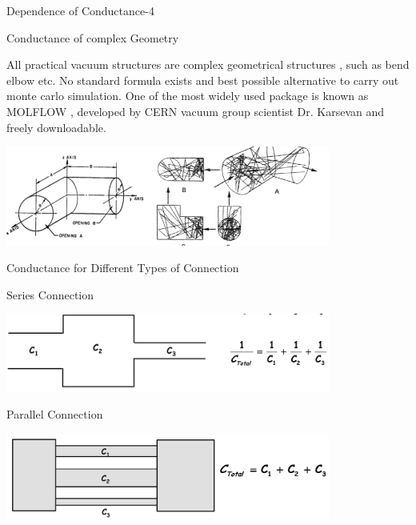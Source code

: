 \documentclass[11]{beamer}
\begin{document}
\begin{frame}{Dependence of Conductance-4}
 
 \begin{block}{Conductance of complex Geometry}
 	
 	All practical vacuum structures are  complex geometrical structures , such as bend elbow etc. No standard formula exists and 
 	best possible alternative to carry out monte carlo simulation. One of the most widely used package is known as MOLFLOW , developed by 
 	CERN vacuum group scientist Dr. Karsevan and freely downloadable.
 	 \begin{center}
		
		\includegraphics[width=0.8\textwidth]{Montecarlo.png}
		
	\end{center}
 	
 		

  \end{block}
\end{frame}






\begin{frame}{Conductance for Different Types of Connection}

 \begin{exampleblock}{Series Connection}
   \begin{center}
		
		\includegraphics[width=0.8\textwidth]{SeriesConnection.png}
		
	\end{center}
\end{exampleblock}
	
\begin{exampleblock}{Parallel Connection}
	 \begin{center}
		\includegraphics[width=0.8\textwidth]{ParalleConnnection.png}
	\end{center}
\end{exampleblock}


\end{frame}
\end{document}
